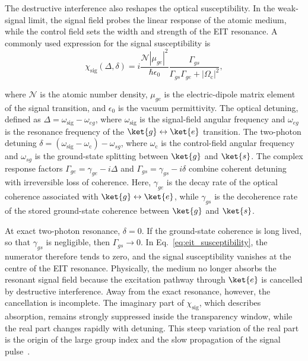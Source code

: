 The destructive interference also reshapes the optical susceptibility. In the weak-signal limit, the signal field probes the linear response of the atomic medium, while the control field sets the width and strength of the EIT resonance. A commonly used expression for the signal susceptibility is~\cite{Apgteitiav_FinkelsteinEtAl_2023,}
\begin{equation}
    \chi_{\mathrm{sig}}(\Delta,\delta)
    =
        i\frac{\mathcal{N}|\mu_{ge}|^2}{\hbar\epsilon_0}
    \frac{\Gamma_{gs}}
    {\Gamma_{gs}\Gamma_{ge}+|\Omega_{\mathrm{c}}|^2},
    \label{eq:eit_susceptibility}
\end{equation}

where $\mathcal{N}$ is the atomic number density, $\mu_{ge}$ is the electric-dipole matrix element of the signal transition, and $\epsilon_0$ is the vacuum permittivity. The optical detuning, defined as $\Delta=\omega_{\mathrm{sig}}-\omega_{eg}$, where $\omega_{\mathrm{sig}}$ is the signal-field angular frequency and $\omega_{eg}$ is the resonance frequency of the $\ket{g}\leftrightarrow\ket{e}$ transition. The two-photon detuning $\delta=(\omega_{\mathrm{sig}}-\omega_{\mathrm{c}})-\omega_{sg}$, where $\omega_{\mathrm{c}}$ is the control-field angular frequency and $\omega_{sg}$ is the ground-state splitting between $\ket{g}$ and $\ket{s}$. The complex response factors $\Gamma_{ge}=\gamma_{ge}-i\Delta$ and $\Gamma_{gs}=\gamma_{gs}-i\delta$ combine coherent detuning with irreversible loss of coherence. Here, $\gamma_{ge}$ is the decay rate of the optical coherence associated with $\ket{g}\leftrightarrow\ket{e}$, while $\gamma_{gs}$ is the decoherence rate of the stored ground-state coherence between $\ket{g}$ and $\ket{s}$.

At exact two-photon resonance, \(\delta=0\). If the ground-state coherence is long lived, so that \(\gamma_{gs}\) is negligible, then \(\Gamma_{gs}\rightarrow0\). In Eq.~\eqref{eq:eit_susceptibility}, the numerator therefore tends to zero, and the signal susceptibility vanishes at the centre of the EIT resonance. Physically, the medium no longer absorbs the resonant signal field because the excitation pathway through \(\ket{e}\) is cancelled by destructive interference. Away from the exact resonance, however, the cancellation is incomplete. The imaginary part of \(\chi_{\mathrm{sig}}\), which describes absorption, remains strongly suppressed inside the transparency window, while the real part changes rapidly with detuning. This steep variation of the real part is the origin of the large group index and the slow propagation of the signal pulse~\cite{Apgteitiav_FinkelsteinEtAl_2023,}.

